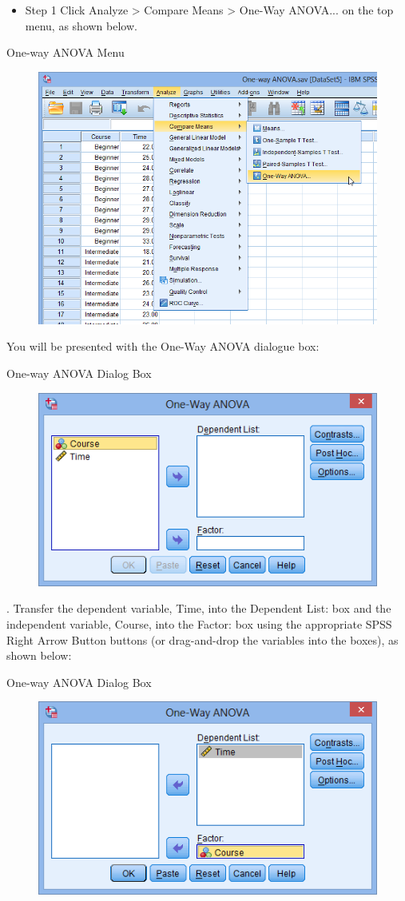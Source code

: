\documentclass[]{article}
\begin{document}
\begin{itemize}
\item Step 1 Click Analyze > Compare Means > One-Way ANOVA... on the top menu, as shown below.
\end{itemize}
One-way ANOVA Menu
\begin{figure}
\centering
\includegraphics[width=0.7\linewidth]{images/one-way-anova-1}
\caption{}
\label{fig:one-way-anova-1}
\end{figure}

You will be presented with the One-Way ANOVA dialogue box:

One-way ANOVA Dialog Box
\begin{figure}[h!]
\centering
\includegraphics[width=0.7\linewidth]{images/one-way-anova-2}
\caption{}
\label{fig:one-way-anova-2}
\end{figure}
.
Transfer the dependent variable, Time, into the Dependent List: box and the independent variable, Course, into the Factor: box using the appropriate SPSS Right Arrow Button buttons (or drag-and-drop the variables into the boxes), as shown below:

One-way ANOVA Dialog Box
\begin{figure}[h!]
\centering
\includegraphics[width=0.7\linewidth]{images/one-way-anova-3}
\caption{}
\label{fig:one-way-anova-3}
\end{figure}
\end{document}

